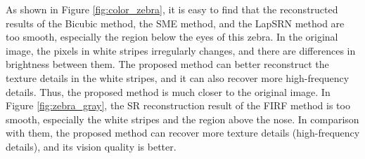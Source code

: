 \documentclass[review,numbers,sort&compress]{elsarticle}  %
\begin{document}
As shown in Figure \ref{fig:color_zebra}, it is easy to find that the reconstructed results of the Bicubic method, the SME method, and the LapSRN method are too smooth, especially the region below the eyes of this zebra. In the original image, the pixels in white stripes irregularly changes, and there are differences in brightness between them. The proposed method can better reconstruct the texture details in the white stripes, and it can also recover more high-frequency details. Thus, the proposed method is much closer to the original image. In Figure \ref{fig:zebra_gray}, the SR reconstruction result of the FIRF method is too smooth, especially the white stripes and the region above the nose. In comparison with them, the proposed method can recover more texture details (high-frequency details), and its vision quality is better.
\begin{figure}[htbp]
    \centering
\end{figure}
\end{document}
